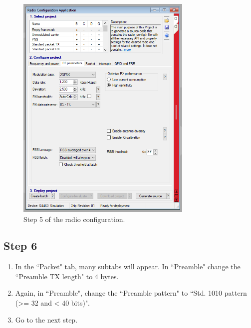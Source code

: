 \documentclass[12pt]{book}
\begin{document}
\begin{appendices}
\begin{figure}[!h]
	\begin{center}
		\includegraphics[width=0.75\textwidth]{figures/wds-tutorial-5.png}
		\caption{Step 5 of the radio configuration.}
		\label{fig:wds-tutorial-step-5}
	\end{center}
\end{figure}

\subsection{Step 6}

\begin{enumerate}
    \item In the ``Packet" tab, many subtabs will appear. In ``Preamble" change the ``Preamble TX length" to 4 bytes.
    \item Again, in ``Preamble", change the ``Preamble pattern" to ``Std. 1010 pattern (>= 32 and < 40 bits)".
    \item Go to the next step.
\end{enumerate}


\end{appendices}
\end{document}
